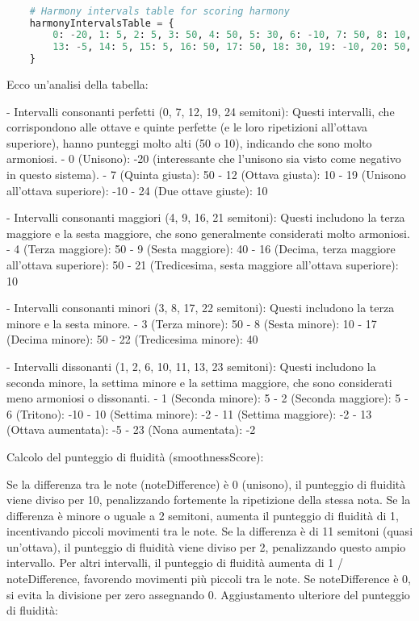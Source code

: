 \documentclass[a4paper,12pt]{report}
\begin{document}
\begin{lstlisting}[language=Python]

    # Harmony intervals table for scoring harmony
    harmonyIntervalsTable = {
        0: -20, 1: 5, 2: 5, 3: 50, 4: 50, 5: 30, 6: -10, 7: 50, 8: 10, 9: 40, 10: -2, 11: -2, 12: 10,
        13: -5, 14: 5, 15: 5, 16: 50, 17: 50, 18: 30, 19: -10, 20: 50, 21: 10, 22: 40, 23: -2, 24: -2, 25: 10
    }

\end{lstlisting}

Ecco un'analisi della tabella:

- Intervalli consonanti perfetti (0, 7, 12, 19, 24 semitoni): Questi intervalli, che corrispondono alle ottave e quinte perfette (e le loro ripetizioni all'ottava superiore), hanno punteggi molto alti (50 o 10), indicando che sono molto armoniosi.
    - 0 (Unisono): -20 (interessante che l'unisono sia visto come negativo in questo sistema).
    - 7 (Quinta giusta): 50
    - 12 (Ottava giusta): 10
    - 19 (Unisono all'ottava superiore): -10
    - 24 (Due ottave giuste): 10

- Intervalli consonanti maggiori (4, 9, 16, 21 semitoni): Questi includono la terza maggiore e la sesta maggiore, che sono generalmente considerati molto armoniosi.
    - 4 (Terza maggiore): 50
    - 9 (Sesta maggiore): 40
    - 16 (Decima, terza maggiore all'ottava superiore): 50
    - 21 (Tredicesima, sesta maggiore all'ottava superiore): 10

- Intervalli consonanti minori (3, 8, 17, 22 semitoni): Questi includono la terza minore e la sesta minore.
    - 3 (Terza minore): 50
    - 8 (Sesta minore): 10
    - 17 (Decima minore): 50
    - 22 (Tredicesima minore): 40

- Intervalli dissonanti (1, 2, 6, 10, 11, 13, 23 semitoni): Questi includono la seconda minore, la settima minore e la settima maggiore, che sono considerati meno armoniosi o dissonanti.
    - 1 (Seconda minore): 5
    - 2 (Seconda maggiore): 5
    - 6 (Tritono): -10
    - 10 (Settima minore): -2
    - 11 (Settima maggiore): -2
    - 13 (Ottava aumentata): -5
    - 23 (Nona aumentata): -2
    
Calcolo del punteggio di fluidità (smoothnessScore):

Se la differenza tra le note (noteDifference) è 0 (unisono), il punteggio di fluidità viene diviso per 10, penalizzando fortemente la ripetizione della stessa nota.
Se la differenza è minore o uguale a 2 semitoni, aumenta il punteggio di fluidità di 1, incentivando piccoli movimenti tra le note.
Se la differenza è di 11 semitoni (quasi un'ottava), il punteggio di fluidità viene diviso per 2, penalizzando questo ampio intervallo.
Per altri intervalli, il punteggio di fluidità aumenta di 1 / noteDifference, favorendo movimenti più piccoli tra le note. 
Se noteDifference è 0, si evita la divisione per zero assegnando 0.
Aggiustamento ulteriore del punteggio di fluidità:
\end{document}
